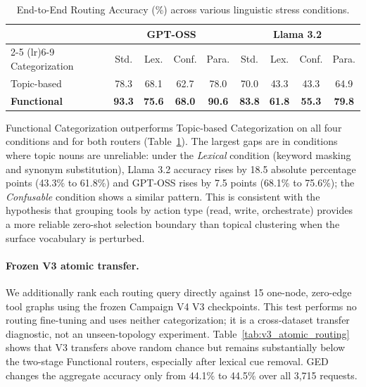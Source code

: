 \documentclass{article}
\begin{document}
\begin{table}[h]
\caption{End-to-End Routing Accuracy (\%) across various linguistic stress conditions.}
\label{tab:routing_results}
\centering
\begin{tabular}{@{}lcccccccc@{}}
\toprule
& \multicolumn{4}{c}{\textbf{GPT-OSS}} & \multicolumn{4}{c}{\textbf{Llama 3.2}} \\
\cmidrule(lr){2-5} \cmidrule(lr){6-9}
Categorization & Std. & Lex. & Conf. & Para. & Std. & Lex. & Conf. & Para. \\
\midrule
Topic-based & 78.3 & 68.1 & 62.7 & 78.0 & 70.0 & 43.3 & 43.3 & 64.9 \\
\textbf{Functional} & \textbf{93.3} & \textbf{75.6} & \textbf{68.0} & \textbf{90.6} & \textbf{83.8} & \textbf{61.8} & \textbf{55.3} & \textbf{79.8} \\
\bottomrule
\end{tabular}
\end{table}

Functional Categorization outperforms Topic-based Categorization on all four conditions and for both routers (Table~\ref{tab:routing_results}). The largest gaps are in conditions where topic nouns are unreliable: under the \textit{Lexical} condition (keyword masking and synonym substitution), Llama 3.2 accuracy rises by 18.5 absolute percentage points (43.3\% to 61.8\%) and GPT-OSS rises by 7.5 points (68.1\% to 75.6\%); the \textit{Confusable} condition shows a similar pattern. This is consistent with the hypothesis that grouping tools by action type (read, write, orchestrate) provides a more reliable zero-shot selection boundary than topical clustering when the surface vocabulary is perturbed.

\paragraph{Frozen V3 atomic transfer.}
We additionally rank each routing query directly against 15 one-node, zero-edge tool graphs using the frozen Campaign V4 V3 checkpoints. This test performs no routing fine-tuning and uses neither categorization; it is a cross-dataset transfer diagnostic, not an unseen-topology experiment. Table~\ref{tab:v3_atomic_routing} shows that V3 transfers above random chance but remains substantially below the two-stage Functional routers, especially after lexical cue removal. GED changes the aggregate accuracy only from 44.1\% to 44.5\% over all 3,715 requests.
\end{document}
